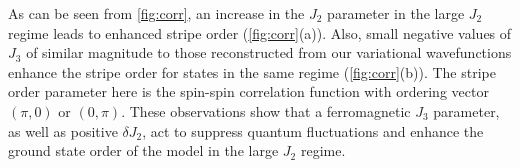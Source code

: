 \documentclass[amsmath,amssymb,aps,prb,superscriptaddress,onecolumn,floatfix]{revtex4}
\begin{document}
As can be seen from \autoref{fig:corr}, an increase in the $J_2$ parameter in the large $J_2$ regime leads to enhanced stripe order (\autoref{fig:corr}(a)). Also, small negative values of $J_3$ of similar magnitude to those reconstructed from our variational wavefunctions enhance the stripe order for states in the same regime (\autoref{fig:corr}(b)).
The stripe order parameter here is the spin-spin correlation function with ordering vector $(\pi, 0)$ or $(0, \pi)$.
These observations show that a ferromagnetic $J_3$ parameter, as well as positive $\delta J_2$, act to suppress quantum fluctuations and enhance the ground state order of the model in the large $J_2$ regime.




\end{document}
